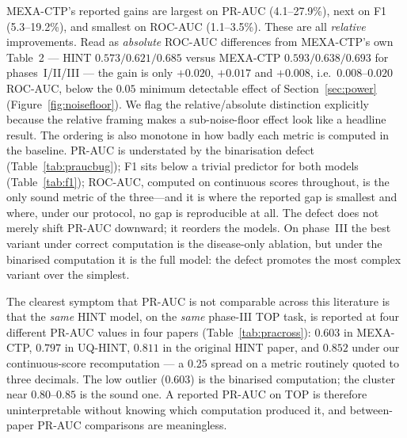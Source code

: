 \documentclass[a4paper,fleqn]{cas-sc}
\begin{document}
MEXA-CTP's reported gains are largest on PR-AUC (4.1--27.9\%), next on F1 (5.3--19.2\%),
and smallest on ROC-AUC (1.1--3.5\%). These are all \emph{relative} improvements. Read as
\emph{absolute} ROC-AUC differences from MEXA-CTP's own Table~2 --- HINT $0.573/0.621/0.685$
versus MEXA-CTP $0.593/0.638/0.693$ for phases~I/II/III --- the gain is only $+0.020$, $+0.017$
and $+0.008$, i.e.\ $0.008$--$0.020$ ROC-AUC, below the $0.05$ minimum detectable effect of
Section~\ref{sec:power} (Figure~\ref{fig:noisefloor}). We flag the relative/absolute distinction
explicitly because the relative framing makes a sub-noise-floor effect look like a headline
result. The ordering is
also monotone in how badly each metric is computed in the baseline. PR-AUC is understated by
the binarisation defect (Table~\ref{tab:praucbug}); F1 sits below a trivial predictor for both
models (Table~\ref{tab:f1}); ROC-AUC, computed on continuous scores throughout, is the only
sound metric of the three---and it is where the reported gap is smallest and where, under our
protocol, no gap is reproducible at all.
The defect does not merely shift PR-AUC downward; it reorders the models. On phase~III the
best variant under correct computation is the disease-only ablation, but under the binarised
computation it is the full model: the defect promotes the most complex variant over the
simplest.

The clearest symptom that PR-AUC is not comparable across this literature is that the
\emph{same} HINT model, on the \emph{same} phase-III TOP task, is reported at four different
PR-AUC values in four papers (Table~\ref{tab:pracross}): $0.603$ in MEXA-CTP, $0.797$ in
UQ-HINT, $0.811$ in the original HINT paper, and $0.852$ under our continuous-score recomputation
--- a $0.25$ spread on a metric routinely quoted to three decimals. The low outlier ($0.603$)
is the binarised computation; the cluster near $0.80$--$0.85$ is the sound one. A reported
PR-AUC on TOP is therefore uninterpretable without knowing which computation produced it, and
between-paper PR-AUC comparisons are meaningless.
\end{document}
